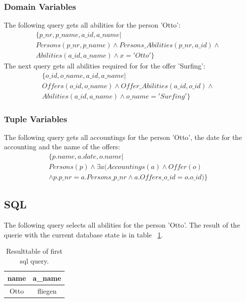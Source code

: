 \documentclass[12pt,a4paper,ngerman]{article}
\begin{document}
\subsubsection{Domain Variables}
The following query gets all abilities for the person 'Otto':
\begin{gather}
\{ p\_nr, p\_name, a\_id, a\_name | \nonumber \\
Persons(p\_nr, p\_name) \wedge Persons\_Abilities(p\_nr, a\_id) \wedge \nonumber \\
Abilities(a\_id, a\_name) \wedge x = 'Otto' \}
\end{gather}
The next query gets all abilities required for for the offer 'Surfing':
\begin{gather}
\{ o\_id, o\_name, a\_id, a\_name | \nonumber \\
Offers(o\_id, o\_name) \wedge Offer\_Abilities(a\_id, o\_id) \wedge \nonumber \\ 
Abilities(a\_id, a\_name) \wedge o\_name = 'Surfing' \}
\end{gather}

\subsubsection{Tuple Variables}
The following query gets all accountings for the person 'Otto', the date for the accounting and the name of the offers:
\begin{gather}
\{ p.name, a.date, o.name | \nonumber \\
Persons(p) \wedge \exists a(Accountings(a) \wedge Offer(o) \nonumber \\
 \wedge p.p\_nr = a.Persons\_p\_nr \wedge a.Offers\_o\_id = o.o\_id) \}
\end{gather}

\subsection{SQL}
The following query selects all abilities for the person 'Otto'. The result of the querie with the current database state is in table ~\ref{tab:sql1}.


\begin{table}[htbp]
\begin{center}\hspace*{-1,5cm}
\begin{tabular}
{| c | c |}
\hline
name & a\_name                      \\ \hline \hline
Otto & fliegen											\\ \hline

\end{tabular}
\caption{Resulttable of first sql query.\label{tab:sql1}}
\end{center}
\end{table}
\end{document}
